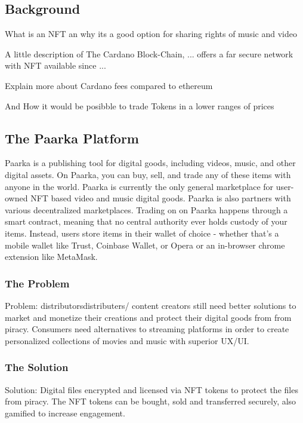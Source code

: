 \documentclass[a4paper,11pt]{article}
\begin{document}
\begin{multicols}{2}	
	
	
	\subsection{Background}
	
	What is an NFT an why its a good option for sharing rights of music and video
	
	A little description of The Cardano Block-Chain, ... offers a far secure network with NFT available since ...
	
	Explain more about Cardano fees compared to ethereum
	
	And How it would be posibble to trade Tokens in a lower ranges of prices
	
	
	
	
	 
	\subsection{The Paarka Platform	}

	
	Paarka is a publishing tool for digital goods, including videos, music, and other digital assets. On Paarka, you can buy, sell, and trade any of these items with anyone in the world. Paarka is currently the only general marketplace for user-owned NFT based video and music digital goods. Paarka is also partners with various  decentralized marketplaces. Trading on on Paarka happens through a smart contract, meaning that no central authority ever holds custody of your items. Instead, users store items in their wallet of choice - whether that's a mobile wallet like Trust, Coinbase Wallet, or Opera or an in-browser chrome extension like MetaMask.
	

	
	\subsubsection{The Problem}
	Problem: distributorsdistributers/ content creators still need better solutions to market and monetize their creations and protect their digital goods from from piracy. Consumers need alternatives to streaming platforms in order to create personalized collections of movies and music with superior UX/UI.
	
	\subsubsection{The Solution}
	Solution: Digital files encrypted and licensed via NFT tokens to protect the files from piracy. The NFT tokens can be bought, sold and transferred securely, also  gamified to increase engagement.
	

\end{multicols}
\end{document}
